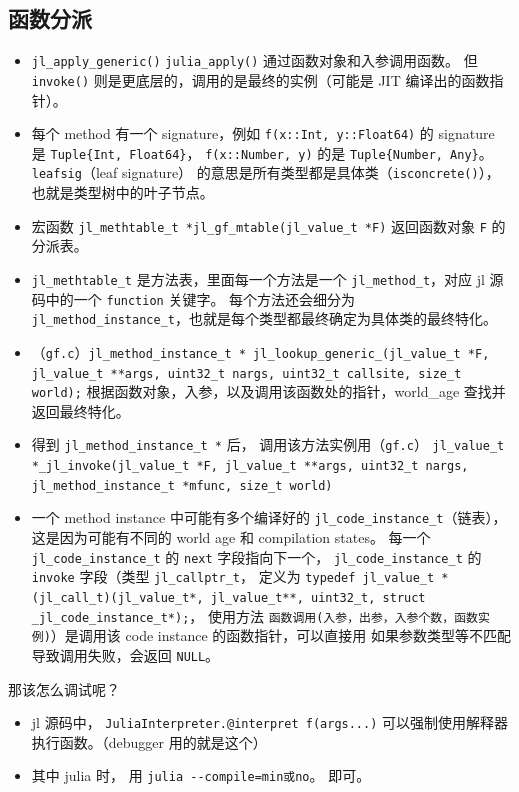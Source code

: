 \subsection{函数分派}
\begin{itemize}
\item \verb`jl_apply_generic()` \verb`julia_apply()` 通过函数对象和入参调用函数。 但 \verb`invoke()` 则是更底层的，调用的是最终的实例（可能是 JIT 编译出的函数指针）。
\item 每个 method 有一个 signature，例如 \verb`f(x::Int, y::Float64)` 的 signature 是 \verb`Tuple{Int, Float64}`， \verb`f(x::Number, y)` 的是 \verb`Tuple{Number, Any}`。 \verb`leafsig`（leaf signature） 的意思是所有类型都是具体类（\verb`isconcrete()`），也就是类型树中的叶子节点。 
\item 宏函数 \verb`jl_methtable_t *jl_gf_mtable(jl_value_t *F)` 返回函数对象 \verb`F` 的分派表。
\item \verb`jl_methtable_t` 是方法表，里面每一个方法是一个 \verb`jl_method_t`，对应 jl 源码中的一个 \verb`function` 关键字。 每个方法还会细分为 \verb`jl_method_instance_t`，也就是每个类型都最终确定为具体类的最终特化。
\item （\verb`gf.c`）\verb`jl_method_instance_t * jl_lookup_generic_(jl_value_t *F, jl_value_t **args, uint32_t nargs, uint32_t callsite, size_t world);` 根据函数对象，入参，以及调用该函数处的指针，world_age 查找并返回最终特化。
\item 得到 \verb`jl_method_instance_t *` 后， 调用该方法实例用（\verb`gf.c`） \verb`jl_value_t *_jl_invoke(jl_value_t *F, jl_value_t **args, uint32_t nargs, jl_method_instance_t *mfunc, size_t world)`
\item 一个 method instance 中可能有多个编译好的 \verb`jl_code_instance_t`（链表），这是因为可能有不同的 world age 和 compilation states。 每一个 \verb`jl_code_instance_t` 的 \verb`next` 字段指向下一个， \verb`jl_code_instance_t` 的 \verb`invoke` 字段（类型 \verb`jl_callptr_t`， 定义为 \verb`typedef jl_value_t *(jl_call_t)(jl_value_t*, jl_value_t**, uint32_t, struct _jl_code_instance_t*);`， 使用方法 \verb`函数调用(入参，出参，入参个数，函数实例)`）是调用该 code instance 的函数指针，可以直接用 如果参数类型等不匹配导致调用失败，会返回 \verb`NULL`。
\end{itemize}

那该怎么调试呢？
\begin{itemize}
\item jl 源码中， \verb`JuliaInterpreter.@interpret f(args...)` 可以强制使用解释器执行函数。（debugger 用的就是这个）
\item 其中 julia 时， 用 \verb`julia --compile=min或no`。 即可。
\end{itemize}
